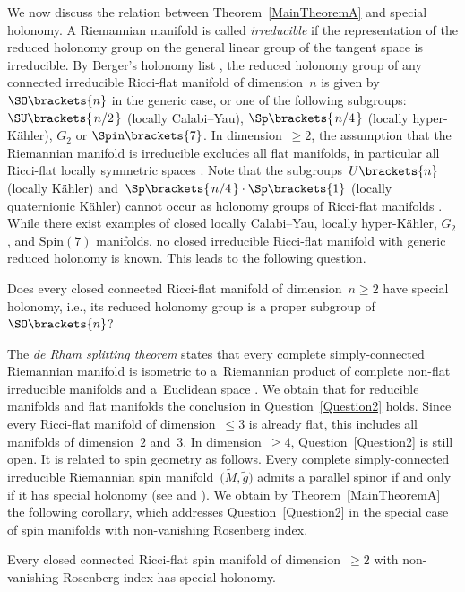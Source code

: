 \documentclass[pdftex]{sigma}
\numberwithin{equation}{section}
\newcommand{\slfrac}[2]{\left.#1\middle/#2\right.}
\begin{document}
We now discuss the relation between Theorem~\ref{MainTheoremA} and special holonomy. A Riemannian manifold is called \textit{irreducible} if the representation of the reduced holonomy group on the general
linear group of the tangent space is irreducible. By Berger's holonomy list \cite{Berger1955}, the reduced holonomy group of any connected irreducible Ricci-flat manifold of dimension~$n$ is given by~$\SO\brackets{n}$ in the generic case, or one of the following subgroups:
$\SU\brackets{\slfrac{n}{2}}$ (locally Calabi--Yau), $\Sp\brackets{\slfrac{n}{4}}$ (locally hyper-K\"ahler), $ G_2 $ or $ \Spin\brackets{7}$. In dimension~$\geq 2$, the assumption that the Riemannian manifold is irreducible excludes all flat manifolds, in particular all Ricci-flat locally symmetric spaces \cite[Theorems 10.72 and 7.61]{Besse1987}. Note that the subgroups~$U\brackets{n}$ (locally K\"ahler) and~$\Sp\brackets{\slfrac{n}{4}}\cdot\Sp\brackets{1}$ (locally quaternionic K\"ahler) cannot occur as holonomy groups of Ricci-flat manifolds \cite[Proposition~10.29 and Theorem~14.45]{Besse1987}. While there exist examples of closed locally Calabi–Yau, locally hyper-K\"ahler, $G_2$, and $\mathrm{Spin}(7)$ manifolds, no closed irreducible Ricci-flat manifold with generic reduced holonomy is known. This leads to the following question.
%
\begin{que} \label{Question2}
 Does every closed connected Ricci-flat manifold of dimension~$n \geq 2$ have special holonomy, i.e., its reduced holonomy group is a proper subgroup of~$\SO\brackets{n}$?
\end{que}
%
The \textit{de Rham splitting theorem} states that every complete simply-connected Riemannian manifold is isometric to a~Riemannian product of complete non-flat irreducible manifolds and a~Euclidean space \cite[Theorem~10.43]{Besse1987}. We obtain that for reducible manifolds and flat manifolds the conclusion in Question~\ref{Question2} holds. Since every Ricci-flat manifold of dimension~$\leq 3$ is already flat, this includes all manifolds of dimension~$2$ and~$3$. In dimension~$\geq 4$, Question~\ref{Question2} is still open. It is related to spin geometry as follows. Every complete simply-connected irreducible Riemannian spin manifold~$\bigl(\tilde{M},\tilde{g}\bigr)$ admits a parallel spinor if and only if it has special holonomy (see \cite[Theorem~1.2]{Hitchin1974} and \cite{Wang1989}). We obtain by Theorem~\ref{MainTheoremA} the following corollary, which addresses Question~\ref{Question2} in the special case of spin manifolds with non-vanishing Rosenberg index.
%
\begin{cor} \label{CorollayB}
 Every closed connected Ricci-flat spin manifold of dimension~$\geq 2$ with non-vanishing Rosenberg index has special holonomy.
\end{cor}
%
\end{document}
